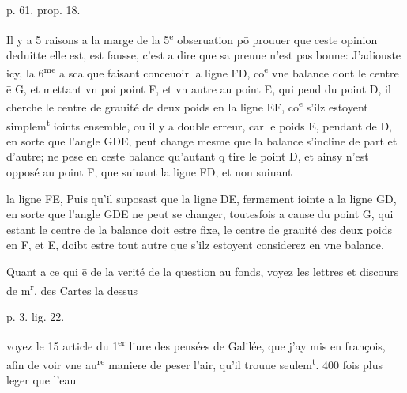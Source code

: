 \documentclass[11pt,a4paper]{article}
\begin{document}
p. 61. prop. 18.

Il y a 5 raisons a la marge de la 5\textsuperscript{e} obseruation pō prouuer que ceste opinion deduitte \ill{} elle est, est fausse, c'est a dire que sa preuue n'est pas bonne: J'adiouste icy, la 6\textsuperscript{me} a sca que faisant conceuoir la ligne FD, co\textsuperscript{e} vne balance dont le centre ē G, et mettant vn poi point F, et vn autre au point E, qui pend du point D, il cherche le centre de grauité de \ill{} deux poids en la ligne EF, co\textsuperscript{e} s'ilz estoyent simplem\textsuperscript{t} ioints ensemble, ou il y a double erreur, car le poids E, pendant de D, en sorte que l'angle GDE, peut change \ill{} mesme que la balance s'incline de part et d'autre; ne pese en ceste balance qu'autant q\ill{} tire le point D, et ainsy n'est opposé au point F, que suiuant la ligne FD, et non suiuant


la ligne FE, Puis qu'il suposast que la ligne DE, fermement iointe a la ligne GD, en sorte que l'angle GDE ne peut se changer, toutesfois a cause du point G, qui estant le centre de la balance doit estre fixe, le centre de grauité des deux poids en F, et E, doibt estre tout autre que s'ilz estoyent considerez en vne balance.

Quant a ce qui ē de la verité de la question au fonds, voyez les lettres et discours de m\textsuperscript{r}. des Cartes la dessus


p. 3. lig. 22.

voyez le 15 article du 1\textsuperscript{er} liure des pensées de Galilée, que j'ay mis en françois, afin de voir vne au\textsuperscript{re} maniere de peser l'air, qu'il trouue seulem\textsuperscript{t}. 400 fois plus leger que l'eau
\end{document}
